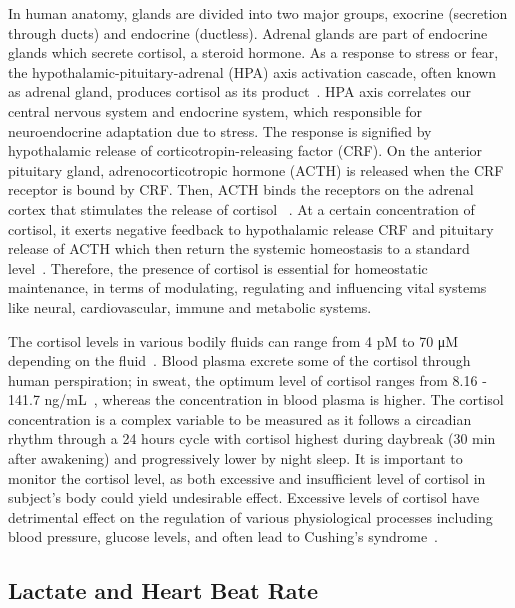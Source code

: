\documentclass[journal]{IEEEtran}
\begin{document}
In human anatomy, glands are divided into two major groups, exocrine (secretion through ducts) and endocrine (ductless). Adrenal glands are part of endocrine glands which secrete cortisol, a steroid hormone. As a response to stress or fear, the hypothalamic-pituitary-adrenal (HPA) axis activation cascade, often known as adrenal gland, produces cortisol as its product~\cite{HPACharacter, CortisolStress}. HPA axis correlates our central nervous system and endocrine system, which responsible for neuroendocrine adaptation due to stress. The response is signified by hypothalamic release of corticotropin-releasing factor (CRF). On the anterior pituitary gland, adrenocorticotropic hormone (ACTH) is released when the CRF receptor is bound by CRF. Then, ACTH binds the receptors on the adrenal cortex that stimulates the release of cortisol~\cite{CortisolStress} . At a certain concentration of cortisol, it exerts negative feedback to hypothalamic release CRF and pituitary release of ACTH which then return the systemic homeostasis to a standard level~\cite{CortisolStress}. Therefore, the presence of cortisol is essential for homeostatic maintenance, in terms of modulating, regulating and influencing vital systems like neural, cardiovascular, immune and metabolic systems.

The cortisol levels in various bodily fluids can range from 4 pM to 70 μM depending on the fluid~\cite{Parlak_membraneElectro}. Blood plasma excrete some of the cortisol through human perspiration; in sweat, the optimum level of cortisol ranges from 8.16 - 141.7 ng/mL~\cite{DetectionCortisolSweat, RookDermatology, ElectronicCortisolDetection}, whereas the concentration in blood plasma is higher. The cortisol concentration is a complex variable to be measured as it follows a circadian rhythm through a 24 hours cycle with cortisol highest during daybreak (30 min after awakening) and progressively lower by night sleep. It is important to monitor the cortisol level, as both excessive and insufficient level of cortisol in subject’s body could yield undesirable effect. Excessive levels of cortisol have detrimental effect on the regulation of various physiological processes including blood pressure, glucose levels, and often lead to Cushing’s syndrome~\cite{Parlak_membraneElectro, Cushing}.

\subsection{Lactate and Heart Beat Rate}
\end{document}
